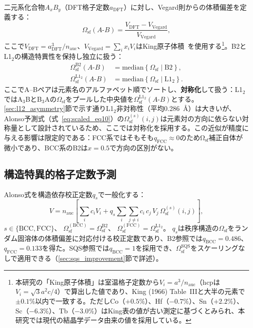 \documentclass[5p,10pt]{elsarticle}
\begin{document}
二元系化合物$A_x B_y$（DFT格子定数$a_\text{DFT}$）に対し、Vegard則からの体積偏差を定義する：
\begin{equation}
  \Omega_\text{sf}(A\text{-}B) =
  \frac{V_\text{DFT} - V_\text{Vegard}}{V_\text{Vegard}},
  \label{eq:omega_def}
\end{equation}
ここで$V_\text{DFT} = a_\text{DFT}^3 / n_\text{auc}$、$V_\text{Vegard} = \sum_i x_i V_i$はKing原子体積~\cite{King1966}を使用する\footnote{本研究の「King原子体積」は室温格子定数から$V_i = a^3/n_\text{auc}$（hcpは$V_i = \sqrt{3}a^2c/4$）で算出した値であり、King (1966) Table~IIIと大半の元素で$\pm 0.1$\%以内で一致する。ただしCo（$+0.5$\%）、Hf（$-0.7$\%）、Sn（$+2.2$\%）、Sc（$-6.3$\%）、Tb（$-3.0$\%）はKing表の値が古い測定に基づくとみられ、本研究では現代の結晶学データ由来の値を採用している。}。B2とL1$_2$の構造特異性を保持し独立に扱う：
\begin{align}
  \Omega_\text{sf}^\text{B2}(A\text{-}B) &= \text{median}\left\{
    \Omega_\text{sf} \mid \text{B2} \right\}, \label{eq:omega_b2} \\
  \Omega_\text{sf}^{\text{L1}_2}(A\text{-}B) &= \text{median}\left\{
    \Omega_\text{sf} \mid \text{L1}_2 \right\}. \label{eq:omega_l12}
\end{align}
ここでA--Bペアは元素名のアルファベット順でソートし、\textbf{対称化}して扱う：L1$_2$ではA$_3$BとB$_3$Aの$\Omega_\text{sf}$をプールした中央値を$\Omega_\text{sf}^{\text{L1}_2}(A\text{-}B)$とする。\ref{sec:l12_asymmetry}節で示す通りL1$_2$非対称性（平均0.286~\AA）は大きいが、Alonso予測式（式~\ref{eq:scaled_eq10}）の$\Omega_\text{sf}^{(s)}(i,j)$は元素対の方向に依らない対称量として設計されているため、ここでは対称化を採用する。この近似が精度に与える影響は限定的である：FCC系ではそもそも$q_\text{FCC} \approx 0$のためΩ$_\text{sf}$補正自体が微小であり、BCC系のB2は$x = 0.5$で方向の区別がない。


\subsection{構造特異的格子定数予測}
\label{sec:ss_eq10}

Alonso式を構造依存校正定数$q_s$で一般化する：
\begin{equation}
  V = n_\text{auc} \!\left[
    \sum_i c_i V_i + q_s \sum_i \sum_{j \ne i}
    c_i\, c_j\, V_j\, \Omega_\text{sf}^{(s)}(i, j)
  \right]\!,
  \label{eq:scaled_eq10}
\end{equation}
$s \in \{\text{BCC}, \text{FCC}\}$、
$\Omega_\text{sf}^{(\text{BCC})} = \Omega_\text{sf}^\text{B2}$、
$\Omega_\text{sf}^{(\text{FCC})} = \Omega_\text{sf}^{\text{L1}_2}$。
$q_s$は秩序構造の$\Omega_\text{sf}$をランダム固溶体の体積偏差に対応付ける校正定数であり、B2参照では$q_\text{BCC} = 0.486$、$q_\text{FCC} = 0.133$を得た。SQS参照では$q_\text{BCC} = 1$を採用でき、$\Omega_\text{sf}^\text{SQS}$をスケーリングなしで適用できる（\ref{sec:sqs_improvement}節で詳述）。
\end{document}
